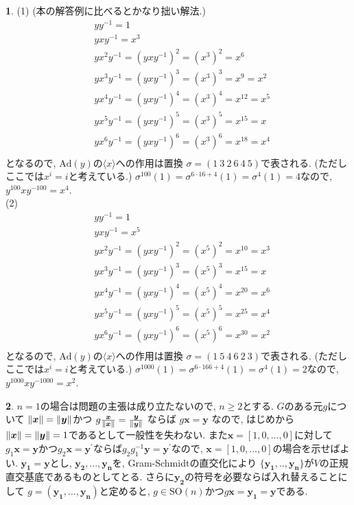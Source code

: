\documentclass{article}
\theoremstyle{definition}
\newtheorem{ans}{}
\numberwithin{ans}{subsection}
\newcommand{\SO}[1]{\mathrm{SO}(#1)}
\newcommand{\Ad}[1]{\mathrm{Ad}(#1)}
\DeclarePairedDelimiter{\norm}{\lVert}{\rVert}
\begin{document}
\begin{ans}
  (1) (本の解答例に比べるとかなり拙い解法.)
  \begin{align*}
    &yy^{-1} = 1\\
    &yxy^{-1} = x^3\\
    &yx^2y^{-1} = (yxy^{-1})^2 = (x^3)^2 = x^6\\
    &yx^3y^{-1} = (yxy^{-1})^3 = (x^3)^3 = x^9 = x^2\\
    &yx^4y^{-1} = (yxy^{-1})^4 = (x^3)^4 = x^{12} = x^5\\
    &yx^5y^{-1} = (yxy^{-1})^5 = (x^3)^5 = x^{15} = x\\
    &yx^6y^{-1} = (yxy^{-1})^6 = (x^3)^6 = x^{18} = x^4\\
  \end{align*}
  となるので, $\Ad{y}$の$\langle x \rangle$への作用は置換
  $\sigma = (1\ 3\ 2\ 6\ 4\ 5)$で表される. (ただしここでは$x^i = i$と考えている.)
  $\sigma^{100}(1) = \sigma^{6 \cdot 16 + 4}(1) = \sigma^{4}(1) = 4$なので, $y^{100}xy^{-100} = x^4$.\\
  (2)
  \begin{align*}
    &yy^{-1} = 1\\
    &yxy^{-1} = x^5\\
    &yx^2y^{-1} = (yxy^{-1})^2 = (x^5)^2 = x^{10} = x^3\\
    &yx^3y^{-1} = (yxy^{-1})^3 = (x^5)^3 = x^{15} = x\\
    &yx^4y^{-1} = (yxy^{-1})^4 = (x^5)^4 = x^{20} = x^6\\
    &yx^5y^{-1} = (yxy^{-1})^5 = (x^5)^5 = x^{25} = x^4\\
    &yx^6y^{-1} = (yxy^{-1})^6 = (x^5)^6 = x^{30} = x^2\\
  \end{align*}
  となるので, $\Ad{y}$の$\langle x \rangle$への作用は置換
  $\sigma = (1\ 5\ 4\ 6\ 2\ 3)$で表される. (ただしここでは$x^i = i$と考えている.)
  $\sigma^{1000}(1) = \sigma^{6 \cdot 166 + 4}(1) = \sigma^{4}(1) = 2$なので, $y^{1000}xy^{-1000} = x^2$.\\
\end{ans}

\begin{ans}
  $n = 1$の場合は問題の主張は成り立たないので, $n \ge 2$とする.
  $G$のある元$g$について
  $\norm{\bm{x}} = \norm{\bm{y}}$かつ
  $g\frac{\bm{x}}{\norm{\bm{x}}} = \frac{\bm{y}}{\norm{\bm{y}}}$
  ならば
  $g\bm{x} = \bm{y}$
  なので, はじめから$\norm{\bm{x}} = \norm{\bm{y}} = 1$であるとして一般性を失わない.
  また$\bm{x} = [1, 0,..., 0]$に対して$g_1\bm{x} = \bm{y}$かつ$g_2\bm{x} = \bm{y}^\prime$ならば$g_2g_1^{-1}\bm{y} = \bm{y}^\prime$なので,
  $\bm{x} = [1, 0,..., 0]$の場合を示せばよい.
  $\bm{y_1} = \bm{y}$とし, $\bm{y_2},..., \bm{y_n}$を, Gram-Schmidtの直交化により
  $\{\bm{y_1},.., \bm{y_n}\}$が$V$の正規直交基底であるものとしてとる.
  さらに$\bm{y_2}$の符号を必要ならば入れ替えることにして
  $g = (\bm{y_1},..., \bm{y_n})$と定めると, $g \in \SO{n}$かつ$g\bm{x} = \bm{y_1} = \bm{y}$である.
\end{ans}
\end{document}

